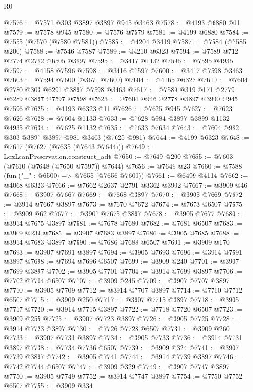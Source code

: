 \begin{lexlean}{R0}
\begin{coremodule}
@7576 := @7571 @303 @3897 @3897 @945 @3463
@7578 := @4193 @6880 @11
@7579 := @7578 @945
@7580 := @7576 @7579
@7581 := @4199 @6880
@7584 := @7555 (@7570 (@7580 @7581))
@7585 := @4204 @3419
@7587 := @7584 (@7585 @200)
@7588 := @7546 @7587
@7589 := @4210 @6323
@7594 := @7589 @712 @2774 @2782 @6505 @3897
@7595 := @3417 @1132
@7596 := @7595 @4935
@7597 := @4158 @7596
@7598 := @3416 @7597
@7600 := @3417 @7598 @3463
@7603 := @7594 @7600 (@3671 @7600)
@7604 := @4165 @6323
@7610 := @7604 @2780 @303 @6291 @3897 @7598 @3463
@7617 := @7589 @319 @171 @2779 @6289 @3897 @7597 @7598
@7623 := @7604 @946 @2778 @3897 @3900 @945 @7596
@7625 := @4193 @6323 @11
@7626 := @7625 @945
@7627 := @7623 @7626
@7628 := @7604 @1133
@7633 := @7628 @984 @3897 @3899 @1132 @4935
@7634 := @7625 @1132
@7635 := @7633 @7634
@7643 := @7604 @982 @303 @3897 @3897 @981 @3463 (@7625 @981)
@7644 := @4199 @6323
@7648 := @7617 (@7627 (@7635 (@7643 @7644)))
@7649 := LexLeanPreservation.construct_adt
@7650 := @7649 @200
@7655 := @7603 (@7610 (@7648 (@7650 @7597)) @7644)
@7656 := @7649 @23
@7660 := @7588 (fun ("_" : @6500) => @7655 (@7656 @7600))
@7661 := @6499 @4114
@7662 := @4068 @6323
@7666 := @7662 @2637 @2791 @3362 @3902
@7667 := @3909 @46
@7668 := @3907 @7667
@7669 := @7668 @3897
@7670 := @3905 @7669
@7672 := @3914 @7667 @3897
@7673 := @7670 @7672
@7674 := @7673 @6507
@7675 := @3909 @62
@7677 := @3907 @7675 @3897
@7678 := @3905 @7677
@7680 := @3914 @7675 @3897
@7681 := @7678 @7680
@7682 := @7681 @6507
@7683 := @3909 @234
@7685 := @3907 @7683 @3897
@7686 := @3905 @7685
@7688 := @3914 @7683 @3897
@7690 := @7686 @7688 @6507
@7691 := @3909 @170
@7693 := @3907 @7691 @3897
@7694 := @3905 @7693
@7696 := @3914 @7691 @3897
@7698 := @7694 @7696 @6507
@7699 := @3909 @240
@7701 := @3907 @7699 @3897
@7702 := @3905 @7701
@7704 := @3914 @7699 @3897
@7706 := @7702 @7704 @6507
@7707 := @3909 @245
@7709 := @3907 @7707 @3897
@7710 := @3905 @7709
@7712 := @3914 @7707 @3897
@7714 := @7710 @7712 @6507
@7715 := @3909 @250
@7717 := @3907 @7715 @3897
@7718 := @3905 @7717
@7720 := @3914 @7715 @3897
@7722 := @7718 @7720 @6507
@7723 := @3909 @255
@7725 := @3907 @7723 @3897
@7726 := @3905 @7725
@7728 := @3914 @7723 @3897
@7730 := @7726 @7728 @6507
@7731 := @3909 @260
@7733 := @3907 @7731 @3897
@7734 := @3905 @7733
@7736 := @3914 @7731 @3897
@7738 := @7734 @7736 @6507
@7739 := @3909 @324
@7741 := @3907 @7739 @3897
@7742 := @3905 @7741
@7744 := @3914 @7739 @3897
@7746 := @7742 @7744 @6507
@7747 := @3909 @329
@7749 := @3907 @7747 @3897
@7750 := @3905 @7749
@7752 := @3914 @7747 @3897
@7754 := @7750 @7752 @6507
@7755 := @3909 @334

\end{coremodule}
\end{lexlean}
